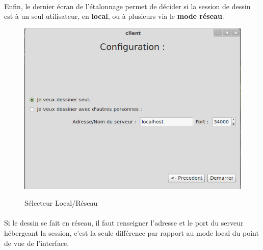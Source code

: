 \documentclass{report}
\begin{document}
				\paragraph{}
				Enfin, le dernier écran de l'étalonnage permet de décider si la session de dessin est à un seul utilisateur, en \textbf{local}, ou à plusieurs via le \textbf{mode réseau}.
				\begin{figure}[!h]
						\centering
						\includegraphics[scale=0.4]{../images/capture_choix.png}\\
						\caption{Sélecteur Local/Réseau}
						\label{Sélecteur Local/Réseau}
				\end{figure}
				\paragraph{}
				Si le dessin se fait en réseau, il faut renseigner l'adresse et le port du serveur hébergeant la session, c'est la seule différence par rapport au mode local du point de vue de l'interface.
				\newpage
\end{document}
